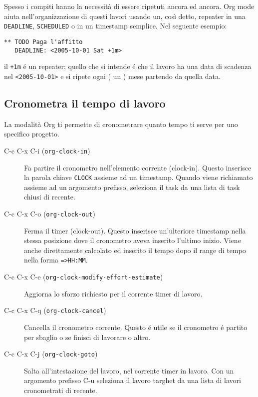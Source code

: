 \documentclass[11pt]{article}
\begin{document}
Spesso i compiti hanno la necessità di essere ripetuti ancora ed
ancora. Org mode aiuta nell'organizzazione di questi lavori usando un,
così detto, repeater in una \texttt{DEADLINE}, \texttt{SCHEDULED} o in un timestamp
semplice. Nel seguente esempio:

\begin{verbatim}
** TODO Paga l'affitto
   DEADLINE: <2005-10-01 Sat +1m>
\end{verbatim}

il \texttt{+1m} é un repeater; quello che si intende é che il
lavoro ha una data di scadenza nel \texttt{<2005-10-01>} e si ripete ogni (
un ) mese partendo da quella data.

\subsection{Cronometra il tempo di lavoro}
\label{sec:orgbe53bba}
La modalità Org ti permette di cronometrare quanto tempo ti serve per
uno specifico progetto.

\begin{description}
\item[{C-c C-x C-i (\texttt{org-clock-in})}] Fa partire il cronometro nell'elemento corrente (clock-in). Questo
inserisce la parola chiave \texttt{CLOCK} assieme ad un timestamp. Quando
viene richiamato assieme ad un argomento prefisso, seleziona il task
da una lista di task chiusi di recente.

\item[{C-c C-x C-o (\texttt{org-clock-out})}] Ferma il timer (clock-out). Questo inserisce un'ulteriore timestamp
nella stessa posizione dove il cronometro aveva inserito l'ultimo
inizio. Viene anche direttamente calcolato ed inserito il tempo dopo
il range di tempo nella forma \texttt{=>HH:MM}.

\item[{C-c C-x C-e (\texttt{org-clock-modify-effort-estimate})}] Aggiorna lo sforzo richiesto per il corrente timer di lavoro.

\item[{C-c C-x C-q (\texttt{org-clock-cancel})}] Cancella il cronometro corrente. Questo é utile se il cronometro é
partito per sbaglio o se finisci di lavorare o altro.

\item[{C-c C-x C-j (\texttt{org-clock-goto})}] Salta all'intestazione del lavoro, nel corrente timer in lavoro. Con un argomento
prefisso C-u seleziona il lavoro targhet da una lista di lavori
cronometrati di recente.
\end{description}
\end{document}
